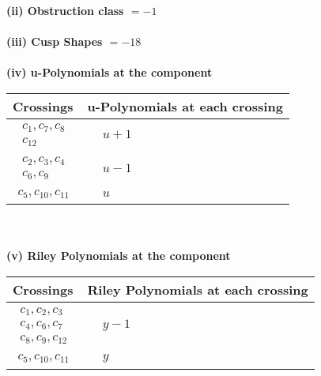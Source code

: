 \documentclass[1p]{elsarticle_modified}
\theoremstyle{definition}
\begin{document}
\flushleft \textbf{(ii) Obstruction class $= -1$}\\~\\
\flushleft \textbf{(iii) Cusp Shapes $= -18$}\\~\\
\newpage\renewcommand{\arraystretch}{1}
\flushleft \textbf{(iv) u-Polynomials at the component}\newline \\
\begin{tabular}{m{50pt}|m{274pt}}
Crossings & \hspace{64pt}u-Polynomials at each crossing \\
\hline $$\begin{aligned}c_{1},c_{7},c_{8}\\c_{12}\end{aligned}$$&$\begin{aligned}
&u+1
\end{aligned}$\\
\hline $$\begin{aligned}c_{2},c_{3},c_{4}\\c_{6},c_{9}\end{aligned}$$&$\begin{aligned}
&u-1
\end{aligned}$\\
\hline $$\begin{aligned}c_{5},c_{10},c_{11}\end{aligned}$$&$\begin{aligned}
&u
\end{aligned}$\\
\hline
\end{tabular}\\~\\
\newpage\renewcommand{\arraystretch}{1}
\flushleft \textbf{(v) Riley Polynomials at the component}\newline \\
\begin{tabular}{m{50pt}|m{274pt}}
Crossings & \hspace{64pt}Riley Polynomials at each crossing \\
\hline $$\begin{aligned}c_{1},c_{2},c_{3}\\c_{4},c_{6},c_{7}\\c_{8},c_{9},c_{12}\end{aligned}$$&$\begin{aligned}
&y-1
\end{aligned}$\\
\hline $$\begin{aligned}c_{5},c_{10},c_{11}\end{aligned}$$&$\begin{aligned}
&y
\end{aligned}$\\
\hline
\end{tabular}\\~\\
\end{document}
